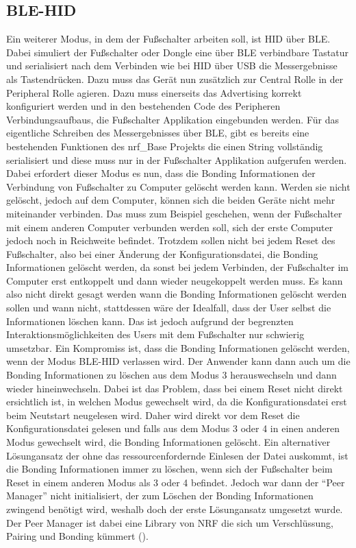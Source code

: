 \subsection{BLE-HID}
Ein weiterer Modus, in dem der Fußschalter arbeiten soll, ist \ac{HID} über \ac{BLE}. Dabei simuliert der Fußschalter oder Dongle eine über \ac{BLE} verbindbare Tastatur und serialisiert nach dem Verbinden wie bei \ac{HID} über USB die Messergebnisse als Tastendrücken. Dazu muss das Gerät nun zusätzlich zur Central Rolle in der Peripheral Rolle agieren. Dazu muss einerseits das Advertising korrekt konfiguriert werden und in den bestehenden Code des Peripheren Verbindungsaufbaus, die Fußschalter Applikation eingebunden werden. Für das eigentliche Schreiben des Messergebnisses über \ac{BLE}, gibt es bereits eine bestehenden Funktionen des nrf\_Base Projekts die einen String vollständig serialisiert und diese muss nur in der Fußschalter Applikation aufgerufen werden.\\
Dabei erfordert dieser Modus es nun, dass die Bonding Informationen der Verbindung von Fußschalter zu Computer gelöscht werden kann. Werden sie nicht gelöscht, jedoch auf dem Computer, können sich die beiden Geräte nicht mehr miteinander verbinden. Das muss zum Beispiel geschehen, wenn der Fußschalter mit einem anderen Computer verbunden werden soll, sich der erste Computer jedoch noch in Reichweite befindet. Trotzdem sollen nicht bei jedem Reset des Fußschalter, also bei einer Änderung der Konfigurationsdatei, die Bonding Informationen gelöscht werden, da sonst bei jedem Verbinden, der Fußschalter im Computer erst entkoppelt und dann wieder neugekoppelt werden muss. Es kann also nicht direkt gesagt werden wann die Bonding Informationen gelöscht werden sollen und wann nicht, stattdessen wäre der Idealfall, dass der User selbst die Informationen löschen kann. Das ist jedoch aufgrund der begrenzten Interaktionsmöglichkeiten des Users mit dem Fußschalter nur schwierig umsetzbar. Ein Kompromiss ist, dass die Bonding Informationen gelöscht werden, wenn der Modus \ac{BLE}-\ac{HID} verlassen wird. Der Anwender kann dann auch um die Bonding Informationen zu löschen aus dem Modus 3 herauswechseln und dann wieder hineinwechseln. Dabei ist das Problem, dass bei einem Reset nicht direkt ersichtlich ist, in welchen Modus gewechselt wird, da die Konfigurationsdatei erst beim Neutstart neugelesen wird. Daher wird direkt vor dem Reset die Konfigurationsdatei gelesen und falls aus dem Modus 3 oder 4 in einen anderen Modus gewechselt wird, die Bonding Informationen gelöscht. Ein alternativer Lösungansatz der ohne das ressourcenfordernde Einlesen der Datei auskommt, ist die Bonding Informationen immer zu löschen, wenn sich der Fußschalter beim Reset in einem anderen Modus als 3 oder 4 befindet. Jedoch war dann der ``Peer Manager'' nicht initialisiert, der zum Löschen der Bonding Informationen zwingend benötigt wird, weshalb doch der erste Lösungansatz umgesetzt wurde. Der Peer Manager ist dabei eine Library von NRF die sich um Verschlüssung, Pairing und Bonding kümmert (\cite[]{NRF_PeerManager}).\\
